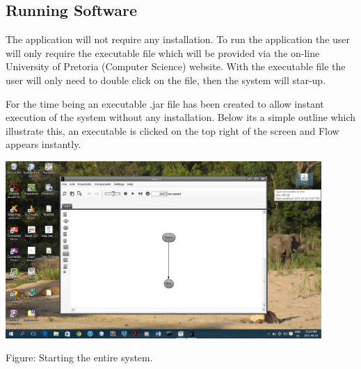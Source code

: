 \documentclass[11pt,a4paper,titlepage]{article}
\begin{document}


	
	\subsection{Running Software}
	
	
		The application will not require any installation. To run the application the user will only require the executable file which will be provided via the on-line University of Pretoria (Computer Science) website. With the executable file the user will only need to double click on the file, then the system will star-up.
		
		For the time being an executable .jar file has been created to allow instant execution of the system without any installation. Below its a simple outline which illustrate this, an executable is clicked on the top right of the screen and Flow appears instantly. \newline \newline
		
		\includegraphics[width=12cm]{RunningFlow.jpg}
			\begin{center}
		Figure: Starting the entire system.\newline
		\end{center} 
		
		
		
		
		
\end{document}
